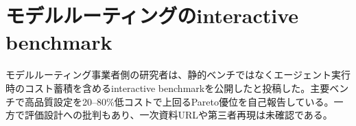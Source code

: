 \section{モデルルーティングのinteractive benchmark}
モデルルーティング事業者側の研究者は、静的ベンチではなくエージェント実行時のコスト蓄積を含めるinteractive benchmarkを公開したと投稿した。主要ベンチで高品質設定を20--80\%低コストで上回るPareto優位を自己報告している。一方で評価設計への批判もあり、一次資料URLや第三者再現は未確認である。
